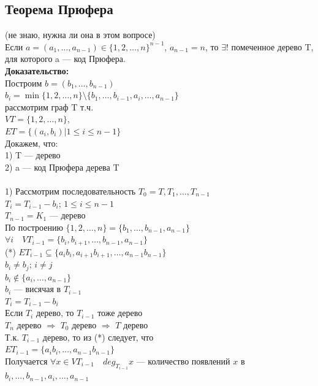 \documentclass[12pt]{article}
\begin{document}
	\subsection{Теорема Прюфера}
		(не знаю, нужна ли она в этом вопросе)\\
		Если $a = (a_1,\dotsc,a_{n-1}) \in \{1,2,\dotsc,n\}^{n-1}$, $a_{n-1} = n$, то $\exists!$ помеченное дерево T, для которого a — код Прюфера.\\
		\textbf{Доказательство:}\\
			Построим $b = (b_1,\dotsc,b_{n-1})$\\
			$b_i = \min\{1,2,\dotsc,n\}\setminus\{b_1,\dotsc,b_{i-1},a_i,\dotsc,a_{n-1}\}$\\
			рассмотрим граф T т.ч.\\
			$VT = \{1,2,\dotsc,n\}$,\\
			$ET = \{(a_i,b_i)|1\leqslant i \leqslant n-1\}$\\
			Докажем, что:\\
			1) T — дерево\\
			2) a — код Прюфера дерева T\\\\
			1) Рассмотрим последовательность $T_0 = T,T_1,\dotsc,T_{n-1}$\\
			$T_i = T_{i-1} - b_i$; $1 \leqslant i \leqslant n-1$\\
			$T_{n-1} = K_1$ — дерево\\
			По построению $\{1,2,\dotsc,n\} = \{b_1,\dotsc,b_{n-1},a_{n-1}\}$\\
			$\forall i \quad VT_{i-1} = \{b_i,b_{i+1},\dotsc,b_{n-1},a_{n-1}\}$\\
			(*) $ET_{i-1} \subseteq \{a_ib_i,a_{i+1}b_{i+1},\dotsc,a_{n-1}b_{n-1}\}$\\
			$b_i \neq b_j$; \quad $i \neq j$\\
			$b_i \notin \{a_i,\dotsc,a_{n-1}\}$\\
			$b_i$ — висячая в $T_{i-1}$\\
			$T_{i} = T_{i-1} - b_i$\\
			Если $T_i$ дерево, то $T_{i-1}$ тоже дерево\\
			$T_n$ дерево $\Rightarrow$ $T_0$ дерево $\Rightarrow$ $T$ дерево\\
			Т.к. $T_{i-1}$ дерево, то из (*) следует, что\\
			$ET_{i-1} = \{a_ib_i,\dotsc,a_{n-1}b_{n-1}\}$\\
			Получается $\forall x \in VT_{i-1} \quad deg_{T_{i-1}}x$ — количество появлений $x$ в $b_i,\dotsc,b_{n-1},a_i,\dotsc,a_{n-1}$\\
\end{document}
